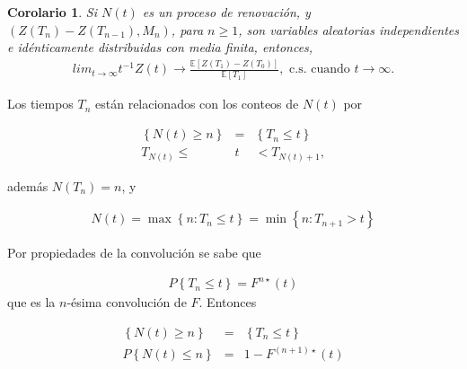 \documentclass{article}
\newtheorem{Coro}{Corolario}
\newcommand{\esp}{\mathbb{E}}
\begin{document}
\begin{Coro}
Si $N\left(t\right)$ es un proceso de renovaci\'on, y $\left(Z\left(T_{n}\right)-Z\left(T_{n-1}\right),M_{n}\right)$, para $n\geq1$, son variables aleatorias independientes e id\'enticamente distribuidas con media finita, entonces,
\begin{eqnarray}
lim_{t\rightarrow\infty}t^{-1}Z\left(t\right)\rightarrow\frac{\esp\left[Z\left(T_{1}\right)-Z\left(T_{0}\right)\right]}{\esp\left[T_{1}\right]},\textrm{ c.s. cuando  }t\rightarrow\infty.
\end{eqnarray}
\end{Coro}



%
%

Los tiempos $T_{n}$ est\'an relacionados con los conteos de $N\left(t\right)$ por

\begin{eqnarray*}
\left\{N\left(t\right)\geq n\right\}&=&\left\{T_{n}\leq t\right\}\\
T_{N\left(t\right)}\leq &t&<T_{N\left(t\right)+1},
\end{eqnarray*}

adem\'as $N\left(T_{n}\right)=n$, y 

\begin{eqnarray*}
N\left(t\right)=\max\left\{n:T_{n}\leq t\right\}=\min\left\{n:T_{n+1}>t\right\}
\end{eqnarray*}

Por propiedades de la convoluci\'on se sabe que

\begin{eqnarray*}
P\left\{T_{n}\leq t\right\}=F^{n\star}\left(t\right)
\end{eqnarray*}
que es la $n$-\'esima convoluci\'on de $F$. Entonces 

\begin{eqnarray*}
\left\{N\left(t\right)\geq n\right\}&=&\left\{T_{n}\leq t\right\}\\
P\left\{N\left(t\right)\leq n\right\}&=&1-F^{\left(n+1\right)\star}\left(t\right)
\end{eqnarray*}
\end{document}
